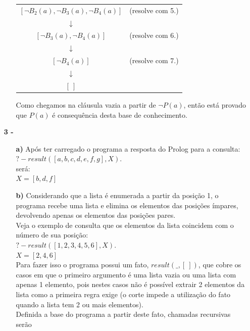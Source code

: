 \documentclass[12pt]{article}
\begin{document}
\begin{itemize}
\begin{itemize}
\begin{center}
\begin{tabular}{c c}
							$[\neg B_2(a), \neg B_3(a), \neg B_4(a)]$ & (resolve com 5.)\\
							$\downarrow$ & \\
							$[\neg B_3(a), \neg B_4(a)]$ & (resolve com 6.)\\
							$\downarrow$ & \\
							$[\neg B_4(a)]$ & (resolve com 7.)\\
							$\downarrow$ & \\
							$[ \ ]$ & \\
						\end{tabular}
					\end{center}
					\hfill\newline
					Como chegamos na cláusula vazia a partir de $\neg P(a)$, então está provado 
					que $P(a)$ é consequência desta base de conhecimento.
			\end{itemize}
		\item[\textbf{3 -}]
			\hfill\newline
			\begin{itemize}
				\item[\textbf{a) }]
					\hfill\newline
					Após ter carregado o programa a resposta do Prolog para a consulta:\\
					$?- result([a , b , c , d , e , f , g], X ).$\\
					será:\\
					$X = [b, d, f]$
				\item[\textbf{b) }]
					\hfill\newline
					Considerando que a lista é enumerada a partir da posição 1, o programa recebe
					uma lista e elimina os elementos das posições ímpares, devolvendo apenas
					os elementos das posições pares.\\
					Veja o exemplo de consulta que os elementos da lista coincidem com o número 
					de sua posição:\\
					$?- result([1, 2, 3, 4, 5, 6], X ).$\\
					$X = [2, 4, 6]$\\
					Para fazer isso o programa possui um fato, $result(\_, [ \ ])$, que cobre os
					casos em que o primeiro argumento é uma lista vazia ou uma lista com apenas
					1 elemento, pois nestes casos não é possível extrair 2 elementos da lista
					como a primeira regra exige (o corte impede a utilização do fato quando
					a lista tem 2 ou mais elementos).\\
					Definida a base do programa a partir deste fato, chamadas recursivas serão

\end{itemize}
\end{itemize}
\end{document}
